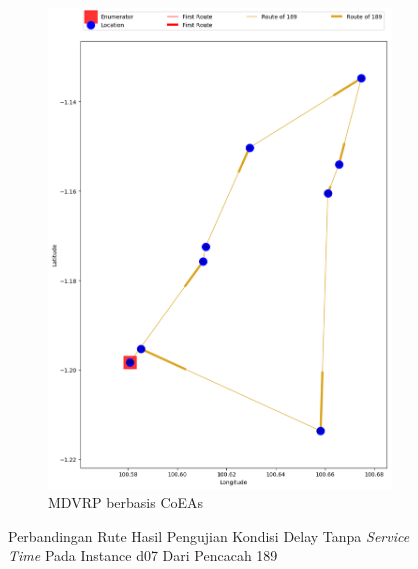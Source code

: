 \begin{figure}[H]
	\centering
	\begin{subfigure}[t]{\textwidth}
		\centering
		\includegraphics[width=\textwidth]{Resources/Images/delayed_7/real_m15_n100_delayed_7_189_coes}
		\caption{MDVRP berbasis CoEAs}
		\label{fig:real_m15_n100_delayed_7_189_coes}
	\end{subfigure}
	\caption{Perbandingan Rute Hasil Pengujian Kondisi Delay Tanpa \textit{Service Time} Pada Instance d07 Dari Pencacah 189}
	\label{fig:real_m15_n100_delayed_7_189}
\end{figure}


